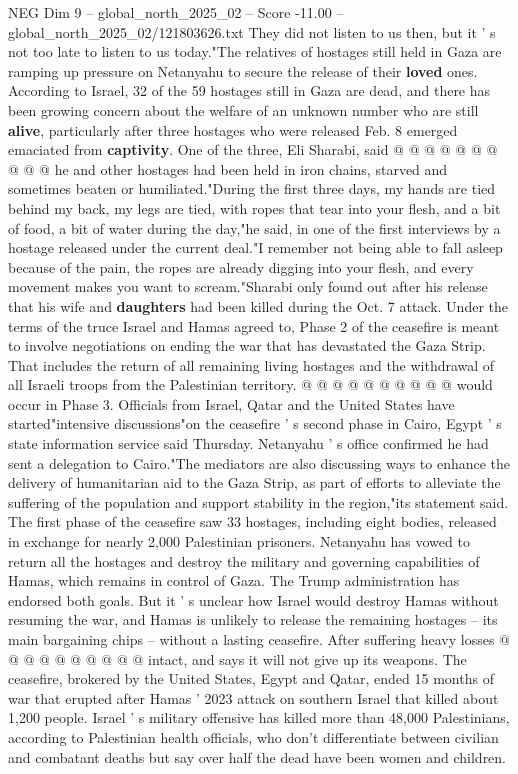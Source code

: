 \begin{textsample}{NEG Dim 9 – global\_north\_2025\_02 – Score -11.00 – global\_north\_2025\_02/121803626.txt}
They did not listen to us then, but it ' s not too late to listen to us today."The relatives of hostages still held in Gaza are ramping up pressure on Netanyahu to secure the release of their \textbf{loved} ones.
According to Israel, 32 of the 59 hostages still in Gaza are dead, and there has been growing concern about the welfare of an unknown number who are still \textbf{alive}, particularly after three hostages who were released Feb. 8 emerged emaciated from \textbf{captivity}.
One of the three, Eli Sharabi, said @ @ @ @ @ @ @ @ @ @ he and other hostages had been held in iron chains, starved and sometimes beaten or humiliated."During the first three days, my hands are tied behind my back, my legs are tied, with ropes that tear into your flesh, and a bit of food, a bit of water during the day,"he said, in one of the first interviews by a hostage released under the current deal."I remember not being able to fall asleep because of the pain, the ropes are already digging into your flesh, and every movement makes you want to scream."Sharabi only found out after his release that his wife and \textbf{daughters} had been killed during the Oct. 7 attack.
Under the terms of the truce Israel and Hamas agreed to, Phase 2 of the ceasefire is meant to involve negotiations on ending the war that has devastated the Gaza Strip.
That includes the return of all remaining living hostages and the withdrawal of all Israeli troops from the Palestinian territory. @ @ @ @ @ @ @ @ @ @ would occur in Phase 3.
Officials from Israel, Qatar and the United States have started"intensive discussions"on the ceasefire ' s second phase in Cairo, Egypt ' s state information service said Thursday.
Netanyahu ' s office confirmed he had sent a delegation to Cairo."The mediators are also discussing ways to enhance the delivery of humanitarian aid to the Gaza Strip, as part of efforts to alleviate the suffering of the population and support stability in the region,"its statement said.
The first phase of the ceasefire saw 33 hostages, including eight bodies, released in exchange for nearly 2,000 Palestinian prisoners.
Netanyahu has vowed to return all the hostages and destroy the military and governing capabilities of Hamas, which remains in control of Gaza.
The Trump administration has endorsed both goals.
But it ' s unclear how Israel would destroy Hamas without resuming the war, and Hamas is unlikely to release the remaining hostages -- its main bargaining chips -- without a lasting ceasefire.
After suffering heavy losses @ @ @ @ @ @ @ @ @ @ intact, and says it will not give up its weapons.
The ceasefire, brokered by the United States, Egypt and Qatar, ended 15 months of war that erupted after Hamas ' 2023 attack on southern Israel that killed about 1,200 people.
Israel ' s military offensive has killed more than 48,000 Palestinians, according to Palestinian health officials, who don't differentiate between civilian and combatant deaths but say over half the dead have been women and children.

\end{textsample}
